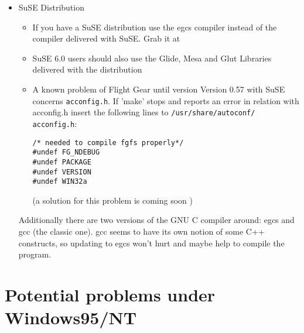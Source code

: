 \begin{itemize}
\item{SuSE Distribution}
\begin{itemize}
 \item If you have a SuSE distribution use the egcs compiler instead
of the compiler delivered with SuSE. Grab it at


 \item SuSE 6.0 users should also use the Glide,
Mesa and Glut Libraries delivered with the distribution
 \item A known problem of Flight Gear until version Version 0.57 with SuSE concerns
  \texttt{acconfig.h}. If 'make' stops and reports an error in relation with acconfig.h
insert the following lines to \texttt{/usr/share/autoconf/} \texttt{acconfig.h}:

        \texttt{/* needed to compile fgfs properly*/}\\
        \texttt{{\#}undef FG\_NDEBUG}\\
        \texttt{{\#}undef PACKAGE}\\
        \texttt{{\#}undef VERSION}\\
        \texttt{{\#}undef WIN32a}

(a solution for this problem is coming soon )
\end{itemize}

  Additionally there are two versions of the GNU C compiler around:
  egcs and gcc (the classic one). gcc seems to have its own notion of
  some C++ constructs, so updating to egcs won't hurt and maybe help
  to compile the program.


\end{itemize}

\section{Potential problems under Windows95/NT}

